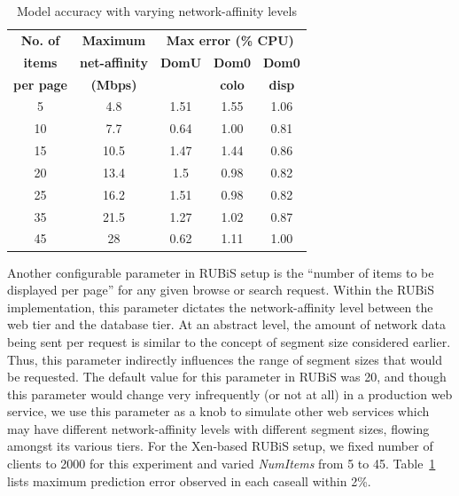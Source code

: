 \begin{table}
	\centering
	\caption{Model accuracy with varying network-affinity levels}
	\begin{tabular}{ |c|c|c|c|c|} \hline
		\textbf{No. of} & \textbf{Maximum} & \multicolumn{3}{|c|}{\textbf{Max error (\% CPU)}} \\ \cline{3-5}
		 \textbf{items} & \textbf{net-affinity} & \textbf{DomU} &  \textbf{Dom0 } & \textbf{Dom0 } \\
\textbf{per page} & \textbf{(Mbps)} &  & \textbf{colo} & \textbf{disp} \\ \hline
   5 & 4.8 & 1.51 & 1.55  & 1.06 \\
	 10 & 7.7 & 0.64 & 1.00 & 0.81 \\
	15 & 10.5 & 1.47 & 1.44  & 0.86 \\
	   20 & 13.4 & 1.5 & 0.98 & 0.82 \\
	   25 & 16.2 & 1.51 & 0.98  & 0.82 \\
	   35 & 21.5 & 1.27 & 1.02  & 0.87 \\
	   45 & 28 & 0.62 & 1.11  & 1.00 \\ \hline
	\end{tabular}
	\label{tab:xennumitems}
\end{table}

Another configurable parameter in RUBiS setup is the ``number
of items to be displayed per page'' %
for any
given browse or search request.
Within the RUBiS implementation, this parameter dictates the
network-affinity level between the web tier and the database tier.
At an abstract level, the amount of network data being sent per request
is similar to the concept of segment size considered earlier.
Thus, this parameter indirectly influences the range of
segment sizes that would be requested. The default value for
this parameter in RUBiS was 20, and though
this parameter would change very infrequently (or not at all) in a
production web service, we use this parameter as a knob to simulate
other web services which may have different network-affinity levels
with different segment sizes, flowing amongst its various tiers.
For the Xen-based RUBiS setup, we fixed number of clients to
2000 for this experiment and varied \textit{NumItems} from 5 to 45.
Table~\ref{tab:xennumitems} lists maximum prediction error
observed in each case\textemdash{}all within 2\%. %

